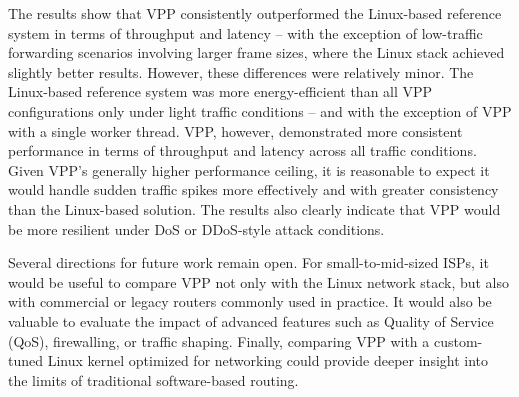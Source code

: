 The results show that VPP consistently outperformed the Linux-based reference system in terms of throughput and latency -- with the exception of low-traffic forwarding scenarios involving larger frame sizes, 
where the Linux stack achieved slightly better results. However, these differences were relatively minor.
The Linux-based reference system was more energy-efficient than all VPP configurations only under light traffic conditions -- and with the exception of VPP with a single worker thread.
VPP, however, demonstrated more consistent performance in terms of throughput and latency across all traffic conditions.
Given VPP’s generally higher performance ceiling, it is reasonable to expect it would handle sudden traffic spikes more effectively and with greater consistency than the Linux-based solution. 
The results also clearly indicate that VPP would be more resilient under DoS or DDoS-style attack conditions.

Several directions for future work remain open. For small-to-mid-sized ISPs, it would be useful to compare VPP not only with the Linux network stack, but 
also with commercial or legacy routers commonly used in practice. 
It would also be valuable to evaluate the impact of advanced features such as Quality of Service (QoS), firewalling, or traffic shaping. 
Finally, comparing VPP with a custom-tuned Linux kernel optimized for networking could provide deeper insight into the limits of traditional software-based routing.

